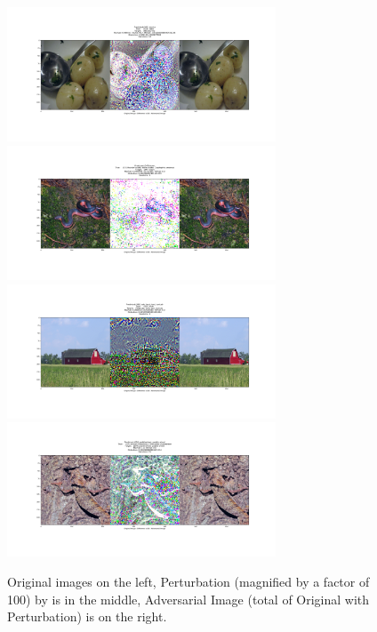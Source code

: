 \begin{figure}[H]
\label{lbfgsis}
\includegraphics[trim=200 185 100 200, clip, width=8cm]{c1_figures/vgg16-ILSVRC2012_val_00039098-O722-A965-attack_summary.png}\includegraphics[trim=200 185 100 200, clip, width=8cm]{c1_figures/vgg16-ILSVRC2012_val_00027142-O52-A347-attack_summary.png}
\includegraphics[trim=200 185 100 200, clip, width=8cm]{c1_figures/vgg16-ILSVRC2012_val_00029901-O425-A468-attack_summary.png}\includegraphics[trim=200 185 100 200, clip, width=8cm]{c1_figures/ILSVRC2012_val_00001375-Otensor([42])-A694-attack_summary.png}
\caption{Original images on the left, Perturbation (magnified by a factor of 100) by is in the middle, Adversarial Image (total of Original with Perturbation) is on the right. }
\end{figure}

